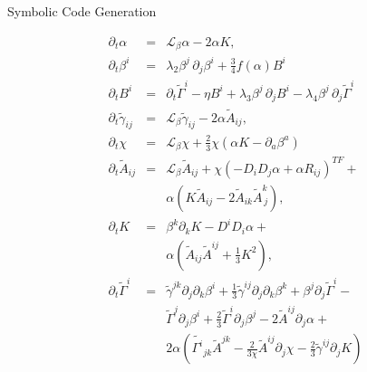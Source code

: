 \documentclass[16pt,xcolor=table]{beamer}
\begin{document}
\begin{frame}[fragile]{Symbolic Code Generation}
\vspace{-0.5in}
\begin{figure}
	\begin{minipage}[t]{.48\textwidth}
		\footnotesize
		\begin{eqnarray*}
			\partial_t \alpha &=&  \mathcal{L}_\beta\alpha - 2 \alpha K, \\
			\partial_t \beta^i &=& \lambda_2 \beta^j\,\partial_j\beta^i + \frac{3}{4} f(\alpha) B^i\\
			\partial_t B^i  &=& \partial_t \tilde\Gamma^i  - \eta B^{i}   + \lambda_3 \beta^j\,\partial_j B^i - \lambda_4 \beta^j\,\partial_j \tilde\Gamma^i \\
			\partial_t \tilde \gamma_{ij} &=&  \mathcal{L}_\beta\tilde{\gamma}_{ij} -2 \alpha \tilde A_{ij}, \\
			\partial_t \chi &=& \mathcal{L}_\beta\chi + \frac{2}{3}\chi \left(\alpha K -  
			\partial_a \beta^a\right)\\
			\partial_t \tilde A_{ij} &=& \mathcal{L}_\beta\tilde{A}_{ij} + \chi \left(-D_i D_j \alpha +
			\alpha R_{ij}\right)^{TF} +\nonumber \\
			&\,&\alpha \left(K \tilde A_{ij} -
			2 \tilde A_{ik} \tilde A^{k}_{\,j}\right), \label{eq:at_evol}\\
			\partial_t K &=& \beta^k\partial_kK- D^i D_i \alpha + \\
			&\,&\alpha \left(\tilde A_{ij}\tilde
			A^{ij} +\frac{1}{3}K^2\right),\\
			\partial_t \tilde \Gamma^i &=& \tilde \gamma^{jk} \partial_j
			\partial_k \beta^i + \frac{1}{3} \tilde \gamma^{ij} \partial_j
			\partial_k \beta^k + \beta^j \partial_j \tilde \Gamma^i - \nonumber \\
			&\,&\tilde
			\Gamma^j \partial_j \beta^i + 
			\frac{2}{3}\tilde \Gamma^i \partial_j
			\beta^j - 2 \tilde A^{i j}\partial_j \alpha + \nonumber \\
			&\,& 2 \alpha \left(\tilde
			{\Gamma^i}_{jk} \tilde A^{jk} - \frac{2}{3 \chi} \tilde A^{ij}\partial_j \chi -
			\frac{2}{3} \tilde \gamma^{ij} \partial_j K\right) \\
		\end{eqnarray*}
	\end{minipage}\hfill%
\end{figure}
\end{frame}
\end{document}
